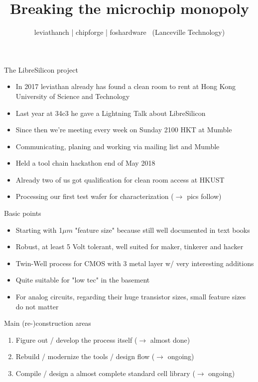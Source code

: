 \documentclass[aspectratio=169]{beamer}
\author{leviathanch | chipforge | foshardware \ (Lanceville Technology)}
\title{Breaking the microchip monopoly}
\begin{document}

\section[Introduction]{}
\begin{frame}{The LibreSilicon project}
	\begin{itemize}
		\item In 2017 leviathan already has found a clean room to rent at Hong Kong University of Science and Technology
		\item Last year at 34c3 he gave a Lightning Talk about LibreSilicon
		\item Since then we're meeting every week on Sunday 2100 HKT at Mumble
		\item Communicating, planing and working via mailing list and Mumble
		\item Held a tool chain hackathon end of May 2018
		\item Already two of us got qualification for clean room access at HKUST
		\item Processing our first test wafer for characterization ($\rightarrow$ pics follow)
	\end{itemize}
\end{frame}

\begin{frame}{Basic points}
	\begin{itemize}
        \setlength\itemsep{1em}
		\item Starting with 1$\mu m$ "feature size" because still well documented in text books
		\item Robust, at least 5 Volt tolerant, well suited for maker, tinkerer and hacker
		\item Twin-Well process for CMOS with 3 metal layer w/ very interesting additions
		\item Quite suitable for "low tec" in the basement
		\item For analog circuits, regarding their huge transistor sizes, small feature sizes do not matter
	\end{itemize}
\end{frame}

\begin{frame}{Main (re-)construction areas}
	\begin{enumerate}
		\item Figure out / develop the process itself ($\rightarrow$ almost done)
		\item Rebuild / modernize the tools / design flow ($\rightarrow$ ongoing)
		\item Compile / design a almost complete standard cell library ($\rightarrow$ ongoing)
	\end{enumerate}
\end{frame}
\end{document}
